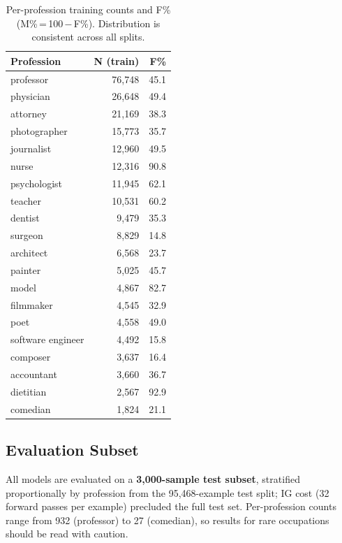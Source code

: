 \documentclass[11pt]{article}
\begin{document}
\begin{table}[h]
\centering\small
\setlength{\tabcolsep}{4pt}
\begin{tabular}{lrr}
\toprule
\textbf{Profession} & \textbf{N (train)} & \textbf{F\%} \\
\midrule
professor         & 76,748 & 45.1 \\
physician         & 26,648 & 49.4 \\
attorney          & 21,169 & 38.3 \\
photographer      & 15,773 & 35.7 \\
journalist        & 12,960 & 49.5 \\
nurse             & 12,316 & 90.8 \\
psychologist      & 11,945 & 62.1 \\
teacher           & 10,531 & 60.2 \\
dentist           &  9,479 & 35.3 \\
surgeon           &  8,829 & 14.8 \\
architect         &  6,568 & 23.7 \\
painter           &  5,025 & 45.7 \\
model             &  4,867 & 82.7 \\
filmmaker         &  4,545 & 32.9 \\
poet              &  4,558 & 49.0 \\
software engineer &  4,492 & 15.8 \\
composer          &  3,637 & 16.4 \\
accountant        &  3,660 & 36.7 \\
dietitian         &  2,567 & 92.9 \\
comedian          &  1,824 & 21.1 \\
\bottomrule
\end{tabular}
\caption{Per-profession training counts and F\% (M\%\,=\,100\,$-$\,F\%).
Distribution is consistent across all splits.}
\label{tab:professions}
\end{table}

\subsection{Evaluation Subset}
All models are evaluated on a \textbf{3,000-sample test subset},
stratified proportionally by profession from the 95,468-example test
split; IG cost (32 forward passes per example) precluded the full test set.
Per-profession counts range from 932 (professor) to 27
(comedian), so results for rare occupations should be read with caution.
\end{document}
